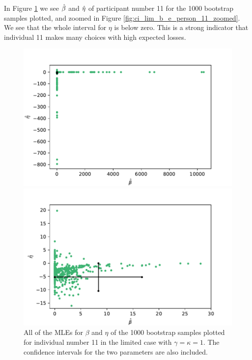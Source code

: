 In Figure \ref{fig:ci_lim_b_e_person_11} we see $\hat{\beta}$ and $\hat{\eta}$ of participant number 11 for the 1000 bootstrap samples plotted, and zoomed in Figure \ref{fig:ci_lim_b_e_person_11_zoomed}. We see that the whole interval for $\eta$ is below zero. This is a strong indicator that individual 11 makes many choices with high expected losses.
\begin{figure}
    \centering
    \begin{minipage}{0.48\textwidth}
        \centering
        \includegraphics[scale=0.36]{pictures/ci_lim_b_e_person11_pdf.pdf}
        \caption[MLEs for $\beta$ and $\eta$ for bootstrap samples individual 11, limited]{All of the MLEs for $\beta$ and $\eta$ of the 1000 bootstrap samples plotted for individual number 11 in the limited case with $\gamma=\kappa=1$. The confidence intervals for the two parameters are also included.}
        \label{fig:ci_lim_b_e_person_11}
    \end{minipage}\hfill
    \begin{minipage}{0.48\textwidth}
        \centering
        \includegraphics[scale=0.36]{pictures/ci_lim_b_e_person11_zoomed_pdf.pdf}

\end{minipage}
\end{figure}
